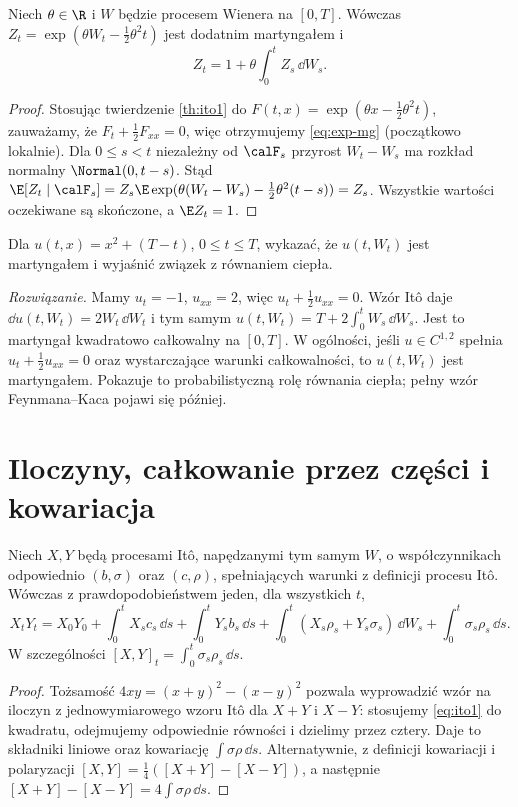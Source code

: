 \begin{twierdzenie}
Niech $\theta\in\R$ i $W$ będzie procesem Wienera na
$[0,T]$. Wówczas $Z_t=\exp(\theta W_t-\tfrac12\theta^2t)$
jest dodatnim martyngałem i
\[
Z_t=1+\theta\int_0^t Z_s\,\dd W_s.
\tag{3.4}\label{eq:exp-mg}
\]
\end{twierdzenie}
\begin{proof}
Stosując twierdzenie \ref{th:ito1} do
$F(t,x)=\exp(\theta x-\frac12\theta^2t)$, zauważamy,
że $F_t+\frac12F_{xx}=0$, więc otrzymujemy
\eqref{eq:exp-mg} (początkowo lokalnie).
Dla $0\le s<t$ niezależny od $\calF_s$ przyrost
$W_t-W_s$ ma rozkład normalny $\Normal(0,t-s)$.
Stąd
$\E[Z_t\mid\calF_s]=Z_s\E\exp(\theta(W_t-W_s)
-\frac12\theta^2(t-s))=Z_s$.
Wszystkie wartości oczekiwane są skończone, a
$\E Z_t=1$.
\end{proof}

\begin{zadanie}
Dla $u(t,x)=x^2+(T-t)$, $0\le t\le T$,
wykazać, że $u(t,W_t)$ jest martyngałem i
wyjaśnić związek z równaniem ciepła.

\emph{Rozwiązanie.} Mamy $u_t=-1$, $u_{xx}=2$,
więc $u_t+\frac12u_{xx}=0$. Wzór Itô daje
$\dd u(t,W_t)=2W_t\,\dd W_t$ i tym samym
$u(t,W_t)=T+2\int_0^tW_s\,\dd W_s$.
Jest to martyngał kwadratowo całkowalny na $[0,T]$.
W ogólności, jeśli $u\in C^{1,2}$ spełnia
$u_t+\frac12u_{xx}=0$ oraz wystarczające warunki
całkowalności, to $u(t,W_t)$ jest martyngałem.
Pokazuje to probabilistyczną rolę równania ciepła;
pełny wzór Feynmana--Kaca pojawi się później.
\end{zadanie}

\section{Iloczyny, całkowanie przez części i kowariacja}
\begin{twierdzenie}
\label{th:ito-product}
Niech $X,Y$ będą procesami Itô, napędzanymi tym samym
$W$, o współczynnikach odpowiednio $(b,\sigma)$ oraz
$(c,\rho)$, spełniających warunki z definicji procesu Itô.
Wówczas z prawdopodobieństwem jeden, dla wszystkich $t$,
\[
X_tY_t=X_0Y_0+\int_0^tX_sc_s\,\dd s
+\int_0^tY_sb_s\,\dd s
+\int_0^t(X_s\rho_s+Y_s\sigma_s)\,\dd W_s
+\int_0^t\sigma_s\rho_s\,\dd s.
\tag{3.5}\label{eq:ito-product}
\]
W szczególności $[X,Y]_t=\int_0^t\sigma_s\rho_s\,\dd s$.
\end{twierdzenie}
\begin{proof}
Tożsamość $4xy=(x+y)^2-(x-y)^2$ pozwala wyprowadzić
wzór na iloczyn z jednowymiarowego wzoru Itô dla
$X+Y$ i $X-Y$: stosujemy \eqref{eq:ito1} do kwadratu,
odejmujemy odpowiednie równości i dzielimy przez cztery.
Daje to składniki liniowe oraz kowariację
$\int\sigma\rho\,\dd s$. Alternatywnie, z definicji
kowariacji i polaryzacji $[X,Y]=\frac14([X+Y]-[X-Y])$,
a następnie $[X+Y]-[X-Y]=4\int\sigma\rho\,\dd s$.
\end{proof}

